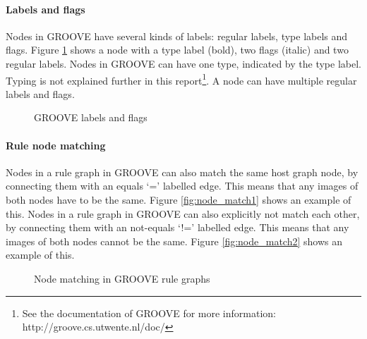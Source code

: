 \paragraph*{Labels and flags}
Nodes in GROOVE have several kinds of labels: regular labels, type labels and flags. Figure \ref{fig:flags} shows a node with a type label (bold), two flags (italic) and two regular labels. Nodes in GROOVE can have one type, indicated by the type label. Typing is not explained further in this report\footnote{See the documentation of GROOVE for more information: http://groove.cs.utwente.nl/doc/}. A node can have multiple regular labels and flags. 

\begin{figure}[h]
  \begin{center}
    
  \end{center}
  \caption{GROOVE labels and flags}
  \label{fig:flags}
\end{figure}

\paragraph*{Rule node matching}
Nodes in a rule graph in GROOVE can also match the same host graph node, by connecting them with an equals `=' labelled edge. This means that any images of both nodes have to be the same. Figure \ref{fig:node_match1} shows an example of this. Nodes in a rule graph in GROOVE can also explicitly not match each other, by connecting them with an not-equals `!=' labelled edge. This means that any images of both nodes cannot be the same. Figure \ref{fig:node_match2} shows an example of this.

\begin{figure}[h]
  \begin{center}
    \hspace{20px}
  \end{center}
  \caption{Node matching in GROOVE rule graphs}
  \label{fig:node_match}
\end{figure}

